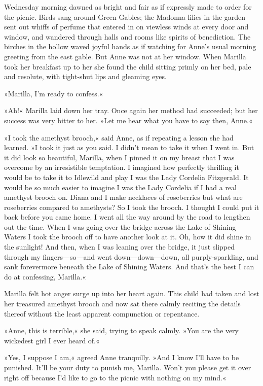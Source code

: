 Wednesday morning dawned as bright and fair as if expressly made to order for the picnic. Birds sang around Green Gables; the Madonna lilies in the garden sent out whiffs of perfume that entered in on viewless winds at every door and window, and wandered through halls and rooms like spirits of benediction. The birches in the hollow waved joyful hands as if watching for Anne’s usual morning greeting from the east gable. But Anne was not at her window. When Marilla took her breakfast up to her she found the child sitting primly on her bed, pale and resolute, with tight-shut lips and gleaming eyes.

»Marilla, I’m ready to confess.«

»Ah!« Marilla laid down her tray. Once again her method had succeeded; but her success was very bitter to her. »Let me hear what you have to say then, Anne.«

»I took the amethyst brooch,« said Anne, as if repeating a lesson she had learned. »I took it just as you said. I didn’t mean to take it when I went in. But it did look so beautiful, Marilla, when I pinned it on my breast that I was overcome by an irresistible temptation. I imagined how perfectly thrilling it would be to take it to Idlewild and play I was the Lady Cordelia Fitzgerald. It would be so much easier to imagine I was the Lady Cordelia if I had a real amethyst brooch on. Diana and I make necklaces of roseberries but what are roseberries compared to amethysts? So I took the brooch. I thought I could put it back before you came home. I went all the way around by the road to lengthen out the time. When I was going over the bridge across the Lake of Shining Waters I took the brooch off to have another look at it. Oh, how it did shine in the sunlight! And then, when I was leaning over the bridge, it just slipped through my fingers—so—and went down—down—down, all purply-sparkling, and sank forevermore beneath the Lake of Shining Waters. And that’s the best I can do at confessing, Marilla.«

Marilla felt hot anger surge up into her heart again. This child had taken and lost her treasured amethyst brooch and now sat there calmly reciting the details thereof without the least apparent compunction or repentance.

»Anne, this is terrible,« she said, trying to speak calmly. »You are the very wickedest girl I ever heard of.«

»Yes, I suppose I am,« agreed Anne tranquilly. »And I know I’ll have to be punished. It’ll be your duty to punish me, Marilla. Won’t you please get it over right off because I’d like to go to the picnic with nothing on my mind.«

